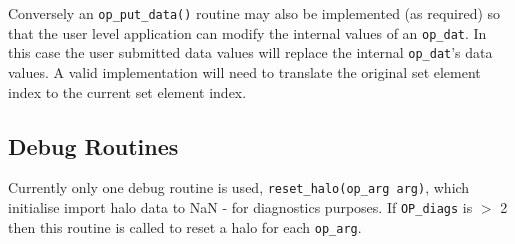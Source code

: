\documentclass[12pt]{article}
\begin{document}
Conversely an \texttt{op\_put\_data()} routine may also be implemented (as required) so that the user level application
can modify the internal values of an \texttt{op\_dat}. In this case the user submitted data values will replace the
internal \texttt{op\_dat}'s data values. A valid implementation will need to translate the original set element index
to the current set element index. 


\subsection{Debug Routines}\label{subsec/debug}
Currently only one debug routine is used, \texttt{reset\_halo(op\_arg arg)}, which initialise import
halo data to NaN - for diagnostics purposes. If \texttt{OP\_diags} is $>$ 2 then this routine is called to reset a halo
for each \texttt{op\_arg}. 

\end{document}
